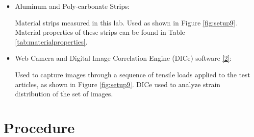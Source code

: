 \documentclass{article}
\begin{document}
\begin{itemize}
\item Aluminum and Poly-carbonate Strips:
\vspace{1mm}

Material strips measured in this lab. Used as shown in Figure \ref{fig:setup9}. Material properties of these strips can be found in Table \ref{tab:materialproperties}.

\vspace{2.5mm}

\item Web Camera and Digital Image Correlation Engine (DICe) software \hyperlink{2}{[2]}:
\vspace{1mm}

Used to capture images through a sequence of tensile loads applied to the test articles, as shown in Figure \ref{fig:setup9}. DICe used to analyze strain distribution of the set of images.
\vspace{2.5mm}
\end{itemize}

\section{Procedure}
\end{document}
